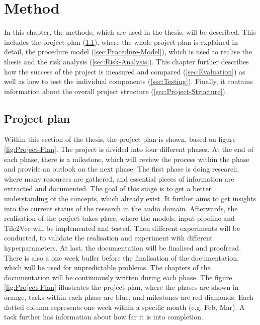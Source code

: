 \chapter{Method}
\label{ch:Method}
In this chapter, the methods, which are used in the thesis, will be described. This includes the project plan (\ref{sec:Project-Plan}), where the whole project plan is explained in detail, the procedure model (\ref{sec:Procedure-Model}), which is used to realise the thesis and the risk analysis (\ref{sec:Risk-Analysis}). This chapter further describes how the success of the project is measured and compared (\ref{sec:Evaluation}) as well as how to test the individual components (\ref{sec:Testing}). Finally, it contains information about the overall project structure (\ref{sec:Project-Structure}).

\section{Project plan}
\label{sec:Project-Plan}
Within this section of the thesis, the project plan is shown, based on figure \ref{fig:Project-Plan}. The project is divided into four different phases. At the end of each phase, there is a milestone, which will review the process within the phase and provide an outlook on the next phase. The first phase is doing research, where many resources are gathered, and essential pieces of information are extracted and documented. The goal of this stage is to get a better understanding of the concepts, which already exist. It further aims to get insights into the current status of the research in the audio domain. Afterwards, the realisation of the project takes place, where the models, input pipeline and Tile2Vec will be implemented and tested. Then different experiments will be conducted, to validate the realisation and experiment with different hyperparameters. At last, the documentation will be finalised and proofread. There is also a one week buffer before the finalisation of the documentation, which will be used for unpredictable problems. The chapters of the documentation will be continuously written during each phase.
\newline
\newline
The figure \ref{fig:Project-Plan} illustrates the project plan, where the phases are shown in orange, tasks within each phase are blue, and milestones are red diamonds. Each dotted column represents one week within a specific month (e.g. Feb, Mar). A task further has information about how far it is into completion.

